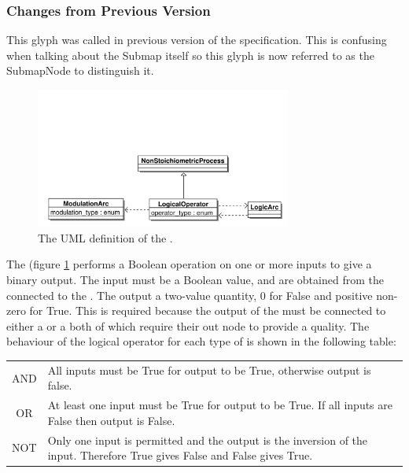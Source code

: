 \subsubsection{Changes from Previous Version}

This glyph was called  in previous version of the \PD
specification. This is confusing when talking about the Submap itself
so this glyph is now referred to as the SubmapNode to distinguish it.

\label{sec:techref:logic}
\label{defn:LogicalOperator}

\begin{figure}[htb]
  \centering
  \includegraphics[width = 0.75\textwidth]{images/logicaloperatoruml}
  \caption{The UML definition of the .}
  \label{fig:techref:logicaloperatoruml}
\end{figure}

 The  (figure \ref{fig:techref:logicaloperatoruml} performs a Boolean operation on one or
more inputs to give a binary output. The input must be a Boolean
value, and are obtained from the  connected to the
. The output a two-value quantity,  0 for False and positive
non-zero for True. This is required because the output of the
 must be connected to either a
 or a  both of which
require their out node to provide a quality. The behaviour of the
logical operator for each type of  is shown in
the following table:

\begin{tabular}[t]{c p{12cm}}
\toprule
AND & All inputs must be True for output to be True, otherwise output
is false.\\
OR & At least one input must be True for output to be True. If all
inputs are False then output is False.\\
NOT & Only one input is permitted and the output is the inversion of
the input. Therefore True gives False and False gives True.\\
\bottomrule
\end{tabular}

